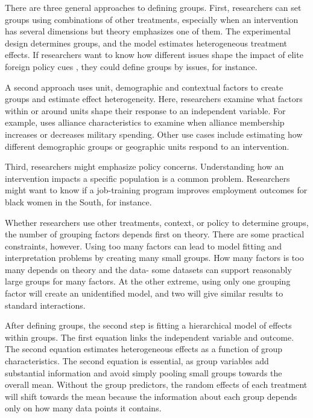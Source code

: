 \documentclass[12pt]{article}
\begin{document}
There are three general approaches to defining groups.  
First, researchers can set groups using combinations of other treatments, especially when an intervention has several dimensions but theory emphasizes one of them. 
The experimental design determines groups, and the model estimates heterogeneous treatment effects.   
If researchers want to know how different issues shape the impact of elite foreign policy cues \citep{GuisingerSaunders2017}, they could define groups by issues, for instance.


A second approach uses unit, demographic and contextual factors to create groups and estimate  effect heterogeneity. 
Here, researchers examine what factors within or around units shape their response to an independent variable.
For example, \citet{Alley2021isq} uses alliance characteristics to examine when alliance membership increases or decreases military spending.
Other use cases include estimating how different demographic groups or geographic units respond to an intervention.


Third, researchers might emphasize policy concerns.
Understanding how an intervention impacts a specific population is a common problem.
Researchers might want to know if a job-training program improves employment outcomes for black women in the South, for instance.  


Whether researchers use other treatments, context, or policy to determine groups, the number of grouping factors depends first on theory.
There are some practical constraints, however.
Using too many factors can lead to model fitting and interpretation problems by creating many small groups.
How many factors is too many depends on theory and the data- some datasets can support reasonably large groups for many factors. 
At the other extreme, using only one grouping factor will create an unidentified model, and two will give similar results to standard interactions. 



After defining groups, the second step is fitting a hierarchical model of effects within groups.
The first equation links the independent variable and outcome.
The second equation estimates heterogeneous effects as a function of group characteristics.
The second equation is essential, as group variables add substantial information and avoid simply pooling small groups towards the overall mean.
Without the group predictors, the random effects of each treatment will shift towards the mean because the information about each group depends only on how many data points it contains. 
\end{document}
